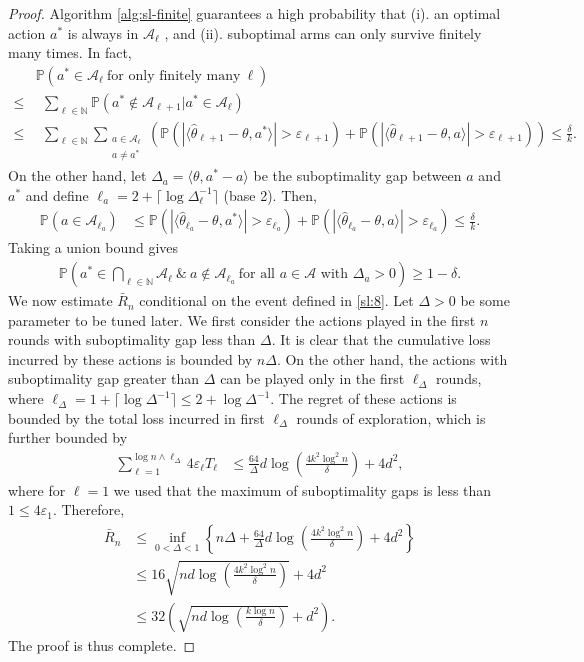 \documentclass[10pt,a4paper]{amsart}
\numberwithin{equation}{section}
\theoremstyle{plain}
\theoremstyle{definition}
\def\N{{\mathbb N}}
\def\P{{\mathbb P}}
\def\e{{\varepsilon}}
\def\t{{\theta}}
\begin{document}
\begin{proof}
Algorithm \ref{alg:sl-finite} guarantees a high probability that (i). an optimal action $a^*$ is always in $\mathcal A_\ell$ , and (ii). suboptimal arms can only survive finitely many times. In fact, 
\begin{align*}
&\P\left(a^*\in\mathcal A_\ell\  \text{for only finitely many}\ \ell \right)\\
\leq&\ \  \sum_{\ell\in\N}\P\left(a^*\notin\mathcal A_{\ell+1}|a^*\in\mathcal A_{\ell}\right)\\
\leq&\ \ \sum_{\ell\in\N}\sum_{\substack{a\in\mathcal A_\ell\\ a\neq a^*}}\left(\P\left(|\langle\hat{\t}_{\ell+1}-\t, a^*\rangle|>\e_{\ell+1}\right)+\P\left(|\langle\hat{\t}_{\ell+1}-\t, a\rangle|>\e_{\ell+1}\right)\right)\leq\frac{\delta}{k}.
\end{align*}
On the other hand, let $\Delta_a = \langle\t, a^*-a\rangle$ be the suboptimality gap between $a$ and $a^*$ and define $\ell_a = 2+\lceil\log\Delta_\ell^{-1}\rceil$ (base 2). Then, 
\begin{align*}
\P\left(a\in\mathcal A_{\ell_a}\right)&\leq \P\left(|\langle\hat{\t}_{\ell_a}-\t, a^*\rangle|>\e_{\ell_a}\right)+\P\left(|\langle\hat{\t}_{\ell_a}-\t, a\rangle|>\e_{\ell_a}\right)\leq \frac{\delta}{k}. 
\end{align*}
Taking a union bound gives
\begin{align}
\P\left(a^*\in\bigcap_{\ell\in\N}\mathcal A_\ell\ \&\ a\notin \mathcal A_{\ell_a}\ \text{for all $a\in\mathcal A$ with $\Delta_a>0$} \right)\geq 1-\delta. \label{sl:8}
\end{align}
We now estimate $\bar{R}_n$ conditional on the event defined in \eqref{sl:8}. Let $\Delta>0$ be some parameter to be tuned later. We first consider the actions played in the first $n$ rounds with suboptimality gap less than $\Delta$. It is clear that the cumulative loss incurred by these actions is bounded by $n\Delta$. On the other hand, the actions with suboptimality gap greater than $\Delta$ can be played only in the first $\ell_\Delta$ rounds, where $\ell_\Delta = 1+\lceil\log\Delta^{-1}\rceil\leq 2+\log\Delta^{-1}$. The regret of these actions is bounded by the total loss incurred in first $\ell_\Delta$ rounds of exploration, which is further bounded by  
\begin{align*}
\sum_{\ell = 1}^{\log n\wedge \ell_\Delta}4\e_\ell T_\ell &\leq \frac{64}{\Delta}d\log\left(\frac{4k^2\log^2 n}{\delta}\right) + 4d^2,
\end{align*} 
where for $\ell=1$ we used that the maximum of suboptimality gaps is less than $1\leq 4\e_1$. Therefore, 
\begin{align*}
\bar{R}_n&\leq\inf_{0<\Delta<1}\left\{n\Delta+\frac{64}{\Delta}d\log\left(\frac{4k^2\log^2 n}{\delta}\right)+4d^2\right\}\\
&\leq 16\sqrt{nd\log\left(\frac{4k^2\log^2 n}{\delta}\right)}+4d^2\\
&\leq 32\left(\sqrt{nd\log\left(\frac{k\log n}{\delta}\right)}+d^2\right). 
\end{align*}
The proof is thus complete. 
\end{proof}
\end{document}

